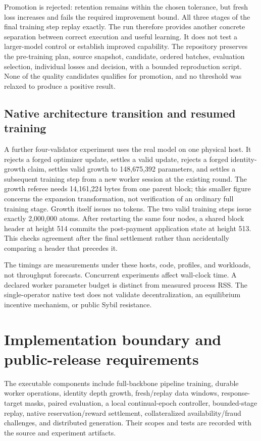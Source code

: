 \documentclass[11pt]{article}
\begin{document}
Promotion is rejected: retention remains within the chosen tolerance, but
fresh loss increases and fails the required improvement bound. All three
stages of the final training step replay exactly. The run therefore provides
another concrete separation between correct execution and useful learning.
It does not test a larger-model control or establish improved capability.
The repository preserves the pre-training plan, source snapshot, candidate,
ordered batches, evaluation selection, individual losses and decision, with
a bounded reproduction script. None of the quality candidates qualifies for
promotion, and no threshold was relaxed to produce a positive result.

\subsection{Native architecture transition and resumed training}
A further four-validator experiment uses the real model on one physical host.
It rejects a forged optimizer update, settles a valid update, rejects a forged
identity-growth claim, settles valid growth to 148,675,392 parameters, and
settles a subsequent training step from a new worker session at the existing
round. The growth referee needs 14,161,224 bytes from one parent block; this
smaller figure concerns the expansion transformation, not verification of an
ordinary full training stage. Growth itself issues no tokens. The two valid
training steps issue exactly 2,000,000 atoms. After restarting the same four
nodes, a shared block header at height 514 commits the post-payment application
state at height 513. This checks agreement after the final settlement rather
than accidentally comparing a header that precedes it.

The timings are measurements under these hosts, code, profiles, and workloads, not throughput forecasts. Concurrent experiments affect wall-clock time. A declared worker parameter budget is distinct from measured process RSS. The single-operator native test does not validate decentralization, an equilibrium incentive mechanism, or public Sybil resistance.

\section{Implementation boundary and public-release requirements}
The executable components include full-backbone pipeline training, durable worker operations, identity depth growth, fresh/replay data windows, response-target masks, paired evaluation, a local continual-epoch controller, bounded-stage replay, native reservation/reward settlement, collateralized availability/fraud challenges, and distributed generation. Their scopes and tests are recorded with the source and experiment artifacts.
\end{document}
